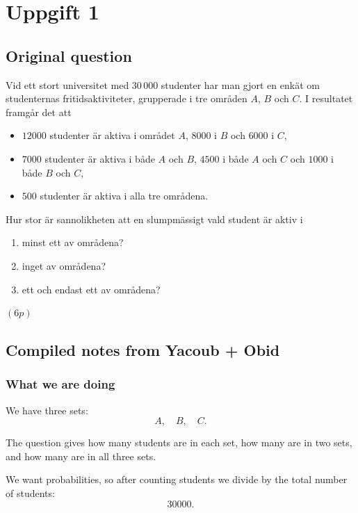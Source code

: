 \documentclass[10pt]{article}
\begin{document}
\section*{Uppgift 1}

\subsection*{Original question}

Vid ett stort universitet med \(30\,000\) studenter har man gjort en
enkät om studenternas fritidsaktiviteter, grupperade i tre områden
\(A\), \(B\) och \(C\). I resultatet framgår det att

\begin{itemize}
\item \(12000\) studenter är aktiva i området \(A\), \(8000\) i \(B\)
och \(6000\) i \(C\),
\item \(7000\) studenter är aktiva i både \(A\) och \(B\), \(4500\) i
både \(A\) och \(C\) och \(1000\) i både \(B\) och \(C\),
\item \(500\) studenter är aktiva i alla tre områdena.
\end{itemize}

Hur stor är sannolikheten att en slumpmässigt vald student är aktiv i

\begin{enumerate}[label=\alph*)]
\item minst ett av områdena?
\item inget av områdena?
\item ett och endast ett av områdena?
\end{enumerate}
\hfill \((6p)\)

\subsection*{Compiled notes from Yacoub + Obid}

\subsubsection*{What we are doing}

We have three sets:
\[
A,\quad B,\quad C.
\]

The question gives how many students are in each set, how many are in
two sets, and how many are in all three sets.

We want probabilities, so after counting students we divide by the
total number of students:
\[
30000.
\]
\end{document}
